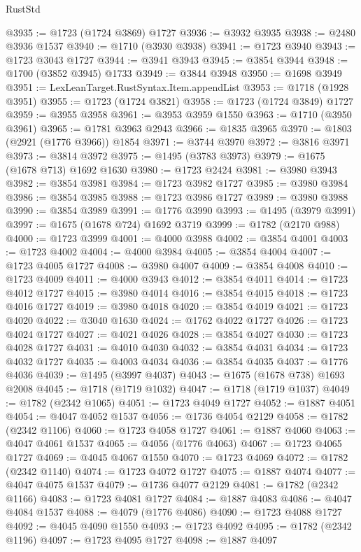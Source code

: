 \begin{lexlean}{RustStd}
\begin{coremodule}
@3935 := @1723 (@1724 @3869) @1727
@3936 := @3932 @3935
@3938 := @2480 @3936 @1537
@3940 := @1710 (@3930 @3938)
@3941 := @1723 @3940
@3943 := @1723 @3043 @1727
@3944 := @3941 @3943
@3945 := @3854 @3944
@3948 := @1700 (@3852 @3945) @1733
@3949 := @3844 @3948
@3950 := @1698 @3949
@3951 := LexLeanTarget.RustSyntax.Item.appendList
@3953 := @1718 (@1928 @3951)
@3955 := @1723 (@1724 @3821)
@3958 := @1723 (@1724 @3849) @1727
@3959 := @3955 @3958
@3961 := @3953 @3959 @1550
@3963 := @1710 (@3950 @3961)
@3965 := @1781 @3963 @2943
@3966 := @1835 @3965
@3970 := @1803 (@2921 (@1776 @3966)) @1854
@3971 := @3744 @3970
@3972 := @3816 @3971
@3973 := @3814 @3972
@3975 := @1495 (@3783 @3973)
@3979 := @1675 (@1678 @713) @1692 @1630
@3980 := @1723 @2424
@3981 := @3980 @3943
@3982 := @3854 @3981
@3984 := @1723 @3982 @1727
@3985 := @3980 @3984
@3986 := @3854 @3985
@3988 := @1723 @3986 @1727
@3989 := @3980 @3988
@3990 := @3854 @3989
@3991 := @1776 @3990
@3993 := @1495 (@3979 @3991)
@3997 := @1675 (@1678 @724) @1692 @3719
@3999 := @1782 (@2170 @988)
@4000 := @1723 @3999
@4001 := @4000 @3988
@4002 := @3854 @4001
@4003 := @1723 @4002
@4004 := @4000 @3984
@4005 := @3854 @4004
@4007 := @1723 @4005 @1727
@4008 := @3980 @4007
@4009 := @3854 @4008
@4010 := @1723 @4009
@4011 := @4000 @3943
@4012 := @3854 @4011
@4014 := @1723 @4012 @1727
@4015 := @3980 @4014
@4016 := @3854 @4015
@4018 := @1723 @4016 @1727
@4019 := @3980 @4018
@4020 := @3854 @4019
@4021 := @1723 @4020
@4022 := @3040 @1630
@4024 := @1762 @4022 @1727
@4026 := @1723 @4024 @1727
@4027 := @4021 @4026
@4028 := @3854 @4027
@4030 := @1723 @4028 @1727
@4031 := @4010 @4030
@4032 := @3854 @4031
@4034 := @1723 @4032 @1727
@4035 := @4003 @4034
@4036 := @3854 @4035
@4037 := @1776 @4036
@4039 := @1495 (@3997 @4037)
@4043 := @1675 (@1678 @738) @1693 @2008
@4045 := @1718 (@1719 @1032)
@4047 := @1718 (@1719 @1037)
@4049 := @1782 (@2342 @1065)
@4051 := @1723 @4049 @1727
@4052 := @1887 @4051
@4054 := @4047 @4052 @1537
@4056 := @1736 @4054 @2129
@4058 := @1782 (@2342 @1106)
@4060 := @1723 @4058 @1727
@4061 := @1887 @4060
@4063 := @4047 @4061 @1537
@4065 := @4056 (@1776 @4063)
@4067 := @1723 @4065 @1727
@4069 := @4045 @4067 @1550
@4070 := @1723 @4069
@4072 := @1782 (@2342 @1140)
@4074 := @1723 @4072 @1727
@4075 := @1887 @4074
@4077 := @4047 @4075 @1537
@4079 := @1736 @4077 @2129
@4081 := @1782 (@2342 @1166)
@4083 := @1723 @4081 @1727
@4084 := @1887 @4083
@4086 := @4047 @4084 @1537
@4088 := @4079 (@1776 @4086)
@4090 := @1723 @4088 @1727
@4092 := @4045 @4090 @1550
@4093 := @1723 @4092
@4095 := @1782 (@2342 @1196)
@4097 := @1723 @4095 @1727
@4098 := @1887 @4097

\end{coremodule}
\end{lexlean}

